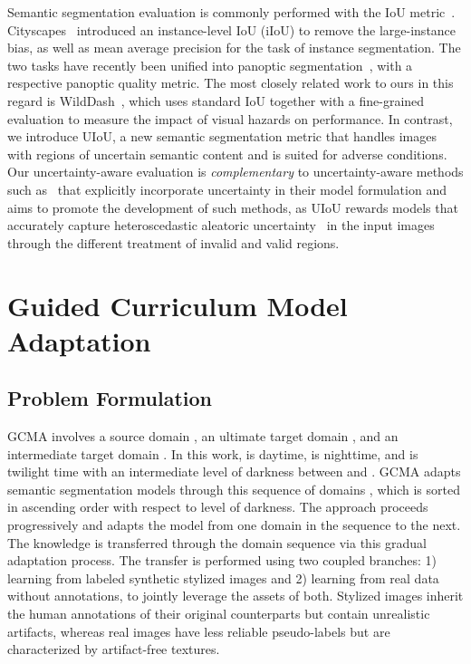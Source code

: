 \documentclass[10pt,twocolumn,letterpaper]{article}
\newcommand{\PAR}[1]{\vskip4pt \noindent{\bf #1~}}
\begin{document}
\PAR{Semantic Segmentation Evaluation.}
Semantic segmentation evaluation is commonly performed with the IoU metric~\cite{pascal:2011}. Cityscapes~\cite{Cityscapes} introduced an instance-level IoU (iIoU) to remove the large-instance bias, as well as mean average precision for the task of instance segmentation. The two tasks have recently been unified into panoptic segmentation~\cite{panoptic:segmentation}, with a respective panoptic quality metric. The most closely related work to ours in this regard is WildDash~\cite{wilddash}, which uses standard IoU together with a fine-grained evaluation to measure the impact of visual hazards on performance. In contrast, we introduce UIoU, a new semantic segmentation metric that handles images with regions of uncertain semantic content and is suited for adverse conditions. Our uncertainty-aware evaluation is \emph{complementary} to uncertainty-aware methods such as~\cite{uncertainty:bayesian} that explicitly incorporate uncertainty in their model formulation and aims to promote the development of such methods, as UIoU rewards models that accurately capture heteroscedastic aleatoric uncertainty~\cite{uncertainty:bayesian} in the input images through the different treatment of invalid and valid regions.  



\section{Guided Curriculum Model Adaptation} 
\label{sec:gcma}


\subsection{Problem Formulation}
\label{sec:gcma:general}
GCMA involves a source domain , an ultimate target domain , and an intermediate target domain . In this work,  is daytime,  is nighttime, and  is twilight time with an intermediate level of darkness between  and . GCMA adapts semantic segmentation models through this sequence of domains , which is sorted in ascending order with respect to level of darkness. The approach proceeds progressively and adapts the model from one domain in the sequence to the next. The knowledge is transferred through the domain sequence via this gradual adaptation process. The transfer is performed using two coupled branches: 1) learning from labeled synthetic stylized images and 2) learning from real data without annotations, to jointly leverage the assets of both. Stylized images inherit the human annotations of their original counterparts but contain unrealistic artifacts, whereas real images have less reliable pseudo-labels but are characterized by artifact-free textures.
\end{document}
